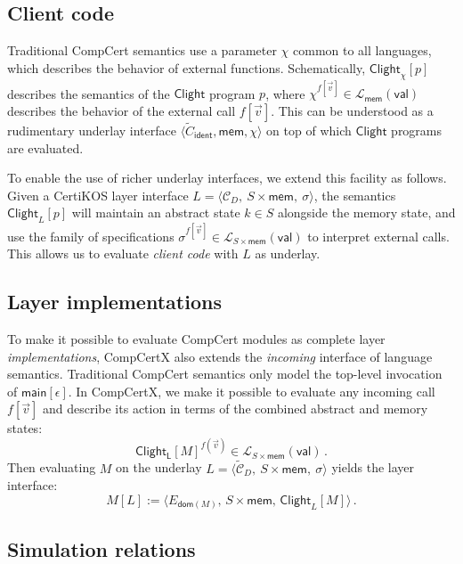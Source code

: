 \documentclass[11pt,oneside,draft]{book}
\theoremstyle{definition}
\newcommand{\kw}[1]{\ensuremath{ \mathsf{#1} }}
\begin{document}

\subsection{Client code} %

Traditional CompCert semantics use a parameter
$\chi$
common to all languages,
which describes the behavior of external functions.
Schematically,
$\kw{Clight}_\chi[p]$
describes the semantics of the \kw{Clight} program $p$,
where
$\chi^{f[\vec{v}]} \in
 \mathcal{L}_\kw{mem}(\kw{val})$
describes the behavior of
the external call $f[\vec{v}]$.
This can be understood as a rudimentary underlay interface
$\langle \tilde{C}_\kw{ident}, \kw{mem}, \chi \rangle$
on top of which \kw{Clight} programs
are evaluated.

To enable the use of richer underlay interfaces,
we extend this facility as follows.
Given a CertiKOS layer interface
$L = \langle \mathcal{C}_D, \: S \times \kw{mem}, \: \sigma \rangle$,
the semantics $\kw{Clight}_L[p]$
will maintain an abstract state $k \in S$
alongside the memory state,
and use the family of specifications
$\sigma^{f[\vec{v}]} \in \mathcal{L}_{S \times \kw{mem}}(\kw{val})$
to interpret external calls.
This allows us to evaluate \emph{client code}
with $L$ as underlay.


\subsection{Layer implementations} %

To make it possible to evaluate CompCert modules
as complete layer \emph{implementations},
CompCertX also extends the \emph{incoming} interface
of language semantics.
Traditional CompCert semantics only model the top-level
invocation of $\kw{main}[\epsilon]$.
In CompCertX,
we make it possible to evaluate
any incoming call $f[\vec{v}]$
and describe its action in terms of
the combined abstract and memory states:
\[
  \kw{Clight_L}[M]^{f(\vec{v})} \in
    \mathcal{L}_{S \times \kw{mem}}(\kw{val})
  \,.
\]
Then evaluating $M$ on the underlay
$L =
 \langle \tilde{\mathcal{C}}_D, \: S \times \kw{mem}, \: \sigma \rangle$
yields the layer interface:
\[
  M[L] :=
    \langle
      E_{\kw{dom}(M)}, \,
      S \times \kw{mem}, \,
      \kw{Clight}_L[M]
    \rangle
  \,.
\]


\subsection{Simulation relations} %
\end{document}
